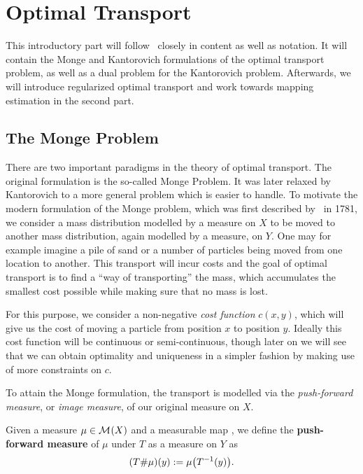 \chapter{Optimal Transport}\label{OT}

This introductory part will follow\ \cite[Chapter~1]{San2015} closely in content as well as notation. It will contain the Monge and Kantorovich formulations of the optimal transport problem, as well as a dual problem for the Kantorovich problem. Afterwards, we will introduce regularized optimal transport and work towards mapping estimation in the second part.

\section{The Monge Problem}\label{TheMonProb}
There are two important paradigms in the theory of optimal transport. The original formulation is the so-called Monge Problem. It was later relaxed by Kantorovich to a more general problem which is easier to handle. To motivate the modern formulation of the Monge problem, which was first described by\ \cite{Mon1781} in 1781, we consider a mass distribution modelled by a measure on $X$ to be moved to another mass distribution, again modelled by a measure, on $Y$. One may for example imagine a pile of sand or a number of particles being moved from one location to another. This transport will incur costs and the goal of optimal transport is to find a ``way of transporting'' the mass, which accumulates the smallest cost possible while making sure that no mass is lost.

For this purpose, we consider a non-negative \textit{cost function} $c(x, y)$, which will give us the cost of moving a particle from position $x$ to position $y$. Ideally this cost function will be continuous or semi-continuous, though later on we will see that we can obtain optimality and uniqueness in a simpler fashion by making use of more constraints on $c$.

To attain the Monge formulation, the transport is modelled via the \textit{push-forward measure}, or \textit{image measure}, of our original measure on $X$.

\begin{definition}\label{PushForward}
	Given a measure $\mu \in \mathcal{M}_{}(X)$ and a measurable map , we define the \textbf{push-forward measure} of $\mu$ under $T$ as a measure on $Y$ as
	\[ ({T} \# \mu)(y) := \mu\big( T^{-1} (y) \big). \]
\end{definition}


